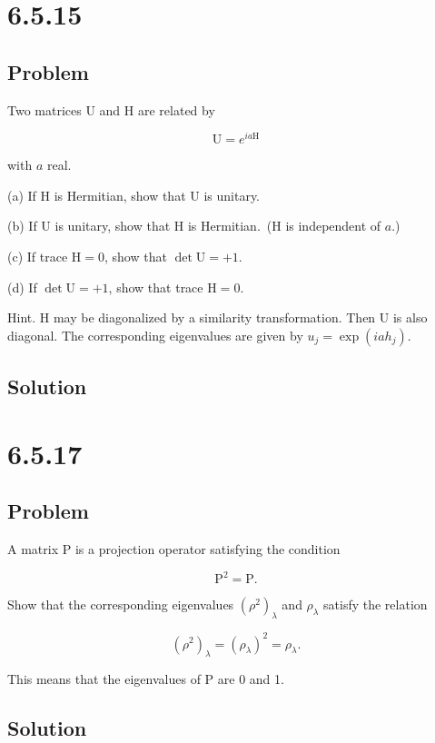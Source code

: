 \documentclass[12pt]{article}
\begin{document}
\newpage
\section{6.5.15}

\subsection{Problem}

Two matrices \(\mathrm{U}\) and \(\mathrm{H}\) are related by

\[
\mathrm{U}=e^{i a \mathrm{H}}
\]

with \(a\) real.

(a) If \(\mathrm{H}\) is Hermitian, show that \(\mathrm{U}\) is unitary.

(b) If \(\mathrm{U}\) is unitary, show that \(\mathrm{H}\) is Hermitian.\ (\(\mathrm{H}\) is independent of \(a\).)

(c) If trace \(\mathrm{H}=0\), show that \(\operatorname{\det} \mathrm{U}=+1\).

(d) If \(\operatorname{\det} \mathrm{U}=+1\), show that trace \(\mathrm{H}=0\).

Hint. \(\mathrm{H}\) may be diagonalized by a similarity transformation. Then \(\mathrm{U}\) is also diagonal. The corresponding eigenvalues are given by \(u_j=\exp \left(i a h_j\right)\).

\subsection{Solution}

\newpage
\section{6.5.17}

\subsection{Problem}

A matrix \(\mathrm{P}\) is a projection operator satisfying the condition

\[
    \mathrm{P}^2=\mathrm{P} .
\]

Show that the corresponding eigenvalues \({\left(\rho^2\right)}_\lambda \) and \(\rho_\lambda \) satisfy the relation

\[
    {\left(\rho^2\right)}_\lambda={\left(\rho_\lambda\right)}^2=\rho_\lambda .
\]

This means that the eigenvalues of \(\mathrm{P}\) are 0 and 1.

\subsection{Solution}

\newpage


\nocite{El-Deeb_PEU-356_Assignments}
\end{document}
